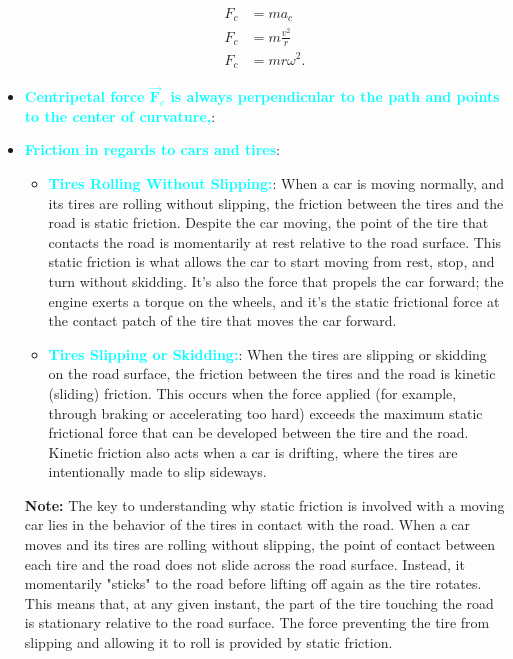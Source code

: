 \documentclass{report}
\begin{document}
\begin{itemize}
\begin{align*}
                        F_{c} &= ma_{c} \\
                        F_{c} &= m \frac{v^{2}}{r}  \\
                              F_{c}&=mr\omega^{2}
                    .\end{align*}
                \item \textbf{\textcolor{cyan}{Centripetal force  $\vec{\mathbf{F}}_{c}$ is always perpendicular to the path and points to the center of curvature,}}:
                \item \textbf{\textcolor{cyan}{Friction in regards to cars and tires}}:
                    \begin{itemize}
                        \item \textbf{\textcolor{cyan}{Tires Rolling Without Slipping:}}: When a car is moving normally, and its tires are rolling without slipping, the friction between the tires and the road is static friction. Despite the car moving, the point of the tire that contacts the road is momentarily at rest relative to the road surface. This static friction is what allows the car to start moving from rest, stop, and turn without skidding. It's also the force that propels the car forward; the engine exerts a torque on the wheels, and it's the static frictional force at the contact patch of the tire that moves the car forward.
                        \item \textbf{\textcolor{cyan}{Tires Slipping or Skidding:}}: When the tires are slipping or skidding on the road surface, the friction between the tires and the road is kinetic (sliding) friction. This occurs when the force applied (for example, through braking or accelerating too hard) exceeds the maximum static frictional force that can be developed between the tire and the road. Kinetic friction also acts when a car is drifting, where the tires are intentionally made to slip sideways.
                    \end{itemize}
                    \bigbreak \noindent 
                    \textbf{Note:} The key to understanding why static friction is involved with a moving car lies in the behavior of the tires in contact with the road. When a car moves and its tires are rolling without slipping, the point of contact between each tire and the road does not slide across the road surface. Instead, it momentarily "sticks" to the road before lifting off again as the tire rotates. This means that, at any given instant, the part of the tire touching the road is stationary relative to the road surface. The force preventing the tire from slipping and allowing it to roll is provided by static friction.

\end{itemize}
\end{document}
